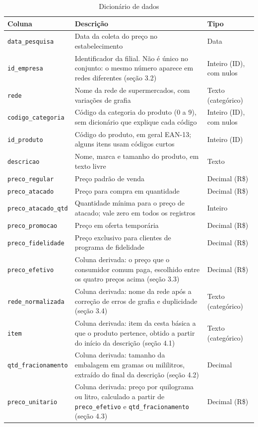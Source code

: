\documentclass[11pt,a4paper]{article}
\newcommand{\col}[1]{\texttt{#1}}
\begin{document}
\begin{table}[H]
\caption{Dicionário de dados}
\label{tab:dicionario}
\small
\begin{tabularx}{\textwidth}{@{}p{4.1cm}X p{2.5cm}@{}}
\toprule
\textbf{Coluna} & \textbf{Descrição} & \textbf{Tipo} \\
\midrule
\col{data\_pesquisa} & Data da coleta do preço no estabelecimento & Data \\
\col{id\_empresa} & Identificador da filial. Não é único no conjunto: o mesmo número aparece em redes diferentes (seção 3.2) & Inteiro (ID), com nulos \\
\col{rede} & Nome da rede de supermercados, com variações de grafia & Texto (categórico) \\
\col{codigo\_categoria} & Código da categoria do produto (0 a 9), sem dicionário que explique cada código & Inteiro (ID), com nulos \\
\col{id\_produto} & Código do produto, em geral EAN-13; alguns itens usam códigos curtos & Inteiro (ID) \\
\col{descricao} & Nome, marca e tamanho do produto, em texto livre & Texto \\
\col{preco\_regular} & Preço padrão de venda & Decimal (R\$) \\
\col{preco\_atacado} & Preço para compra em quantidade & Decimal (R\$) \\
\col{preco\_atacado\_qtd} & Quantidade mínima para o preço de atacado; vale zero em todos os registros & Inteiro \\
\col{preco\_promocao} & Preço em oferta temporária & Decimal (R\$) \\
\col{preco\_fidelidade} & Preço exclusivo para clientes de programa de fidelidade & Decimal (R\$) \\
\midrule
\col{preco\_efetivo} & Coluna derivada: o preço que o consumidor comum paga, escolhido entre os quatro preços acima (seção 3.3) & Decimal (R\$) \\
\col{rede\_normalizada} & Coluna derivada: nome da rede após a correção de erros de grafia e duplicidade (seção 3.4) & Texto (categórico) \\
\col{item} & Coluna derivada: item da cesta básica a que o produto pertence, obtido a partir do início da descrição (seção 4.1) & Texto (categórico) \\
\col{qtd\_fracionamento} & Coluna derivada: tamanho da embalagem em gramas ou mililitros, extraído do final da descrição (seção 4.2) & Decimal \\
\col{preco\_unitario} & Coluna derivada: preço por quilograma ou litro, calculado a partir de \col{preco\_efetivo} e \col{qtd\_fracionamento} (seção 4.3) & Decimal (R\$) \\
\bottomrule
\end{tabularx}
\end{table}
\end{document}

